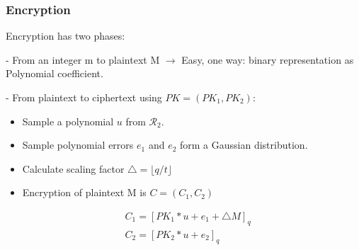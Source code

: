 \documentclass[10pt]{beamer}
\begin{document}
\begin{frame}[noframenumbering]

    \frametitle{Encryption}

    Encryption has two phases:

    - From an integer m to plaintext M $\rightarrow$ Easy, one way: binary representation as Polynomial coefficient.

    - From plaintext to ciphertext using $PK = (PK_1, PK_2)$:

    \begin{itemize}
        \item Sample a polynomial $u$ from $\mathcal{R}_2$.
        \item Sample polynomial errors $e_1$ and $e_2$ form a Gaussian distribution.
        \item Calculate scaling factor $\triangle = \lfloor q/t\rfloor $
        \item Encryption of plaintext M is $C=(C_1, C_2)$
    \end{itemize}
    \begin{align}
        &C_1 = [PK_1 * u + e_1 + \triangle M ]_q\nonumber \\
        &C_2 = [PK_2 * u + e_2]_q\nonumber
    \end{align}


\end{frame}
\end{document}
